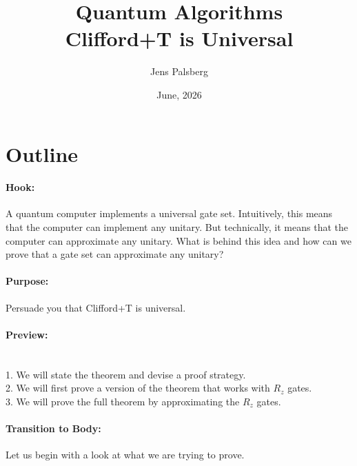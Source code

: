 \documentclass[11pt]{article}
\title{Quantum Algorithms \\
       Clifford+T is Universal}
\author{Jens Palsberg}
\date{June, 2026}
\begin{document}
\maketitle


\newpage


\vspace*{-1.2cm}

\section*{Outline}

\paragraph{Hook:} 
A quantum computer implements a universal gate set.
Intuitively, this means that the computer can implement any unitary. 
But technically, it means that the computer can approximate any unitary.
What is behind this idea and how can we prove that 
a gate set can approximate any unitary?

\paragraph{Purpose:} Persuade you that Clifford+T is universal.

\paragraph{Preview:} \mbox{} \\
\hspace*{1cm}
1. We will state the theorem and devise a proof strategy.
\\
\hspace*{1cm}
2. We will first prove a version of the theorem that works with $R_z$ gates.
\\
\hspace*{1cm}
3. We will prove the full theorem by approximating the $R_z$ gates.

\paragraph{Transition to Body:} 
Let us begin with a look at what we are trying to prove.
\end{document}

